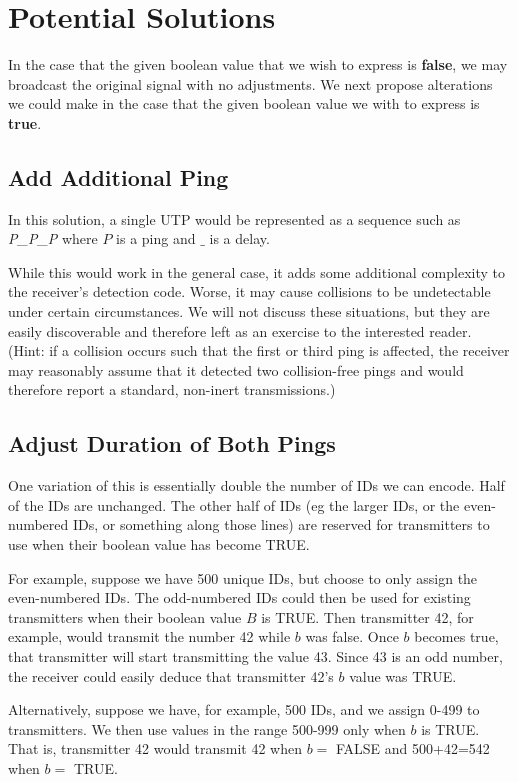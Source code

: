 \documentclass[12pt]{article}
\begin{document}
\section{Potential Solutions}

In the case that the given boolean value that we wish to express is
{\bf false}, we may broadcast the original signal with no adjustments.
We next propose alterations we could make in the case that the given boolean
value we with to express is {\bf true}.

\subsection{Add Additional Ping}

In this solution, a single UTP would be represented as a sequence such as
{\em P\_P\_P} where $P$ is a ping and $\_$ is a delay.

While this would work in the general case, it adds some additional complexity
to the receiver's detection code.
Worse, it may cause collisions to be undetectable under certain circumstances.
We will not discuss these situations, but they are easily discoverable and
therefore left as an exercise to the interested reader.
(Hint: if a collision occurs such that the first or third ping is affected,
the receiver may reasonably assume that it detected two collision-free pings
and would therefore report a standard, non-inert transmissions.)

\subsection{Adjust Duration of Both Pings}

One variation of this is essentially double the number of IDs we can encode.
Half of the IDs are unchanged.
The other half of IDs (eg the larger IDs, or the even-numbered IDs, or
something along those lines) are reserved for transmitters to use when their
boolean value has become TRUE.

For example, suppose we have 500 unique IDs, but choose to only assign the
even-numbered IDs.
The odd-numbered IDs could then be used for existing transmitters when their
boolean value $B$ is TRUE.
Then transmitter 42, for example, would transmit the number 42 while $b$ was
false.
Once $b$ becomes true, that transmitter will start transmitting the value 43.
Since 43 is an odd number, the receiver could easily deduce that transmitter
42's $b$ value was TRUE.

Alternatively, suppose we have, for example, 500 IDs, and we assign 0-499 to
transmitters.
We then use values in the range 500-999 only when $b$ is TRUE.
That is, transmitter 42 would transmit 42 when $b=$ FALSE and 500+42=542 when
$b=$ TRUE.
\end{document}
